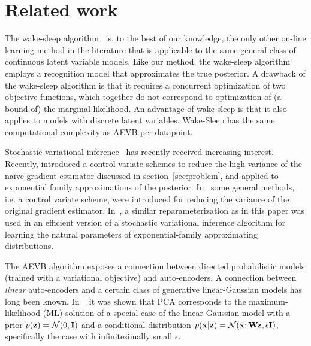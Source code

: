 \documentclass{article} %
\theoremstyle{definition}
\begin{document}
\section{Related work}
The wake-sleep algorithm~\cite{hinton1995wake} is, to the best of our knowledge, the only other on-line learning method in the literature that is applicable to the same general class of continuous latent variable models. Like our method, the wake-sleep algorithm employs a recognition model that approximates the true posterior. A drawback of the wake-sleep algorithm is that it requires a concurrent optimization of two objective functions, which together do not correspond to optimization of (a bound of) the marginal likelihood.
%
An advantage of wake-sleep is that it also applies to models with discrete latent variables. Wake-Sleep has the same computational complexity as AEVB per datapoint.

Stochastic variational inference~\cite{hoffman2013stochastic} has recently received increasing interest. Recently, \cite{blei2012variational} introduced a control variate schemes to reduce the high variance of the na\"ive gradient estimator discussed in section~\ref{sec:problem}, and applied to exponential family approximations of the posterior. In~\cite{ranganath2013black} some general methods, i.e. a control variate scheme, were introduced for reducing the variance of the original gradient estimator. In~\cite{salimans2013fixedform}, a similar reparameterization as in this paper was used in an efficient version of a stochastic variational inference algorithm for learning the natural parameters of exponential-family approximating distributions.

%

%

The AEVB algorithm exposes a connection between directed probabilistic models (trained with a variational objective) and auto-encoders. A connection between \emph{linear} auto-encoders and a certain class of generative linear-Gaussian models has long been known. In ~\cite{roweis1998algorithms} it was shown that PCA corresponds to the maximum-likelihood (ML) solution of a special case of the linear-Gaussian model with a prior $p(\mathbf{z}) = \mathcal{N}(0,\mathbf{I})$ and a conditional distribution $p(\mathbf{x}|\mathbf{z}) = \mathcal{N}(\mathbf{x}; \mathbf{W} \mathbf{z}, \epsilon \mathbf{I})$, specifically the case with infinitesimally small $\epsilon$. 
%
%
%
%
\end{document}
